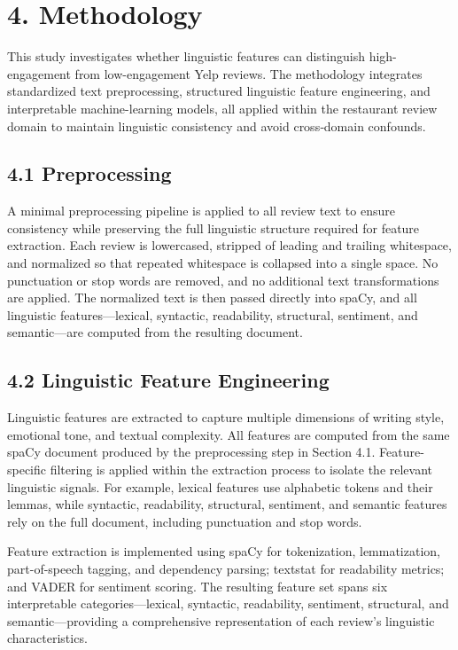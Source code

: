 \documentclass[
]{article}
\begin{document}
\hypertarget{methodology}{%
\section{4. Methodology}\label{methodology}}

This study investigates whether linguistic features can distinguish
high-engagement from low-engagement Yelp reviews. The methodology
integrates standardized text preprocessing, structured linguistic
feature engineering, and interpretable machine-learning models, all
applied within the restaurant review domain to maintain linguistic
consistency and avoid cross‑domain confounds.

\hypertarget{preprocessing}{%
\subsection{4.1 Preprocessing}\label{preprocessing}}

A minimal preprocessing pipeline is applied to all review text to ensure
consistency while preserving the full linguistic structure required for
feature extraction. Each review is lowercased, stripped of leading and
trailing whitespace, and normalized so that repeated whitespace is
collapsed into a single space. No punctuation or stop words are removed,
and no additional text transformations are applied. The normalized text
is then passed directly into spaCy, and all linguistic
features---lexical, syntactic, readability, structural, sentiment, and
semantic---are computed from the resulting document.

\hypertarget{linguistic-feature-engineering}{%
\subsection{4.2 Linguistic Feature
Engineering}\label{linguistic-feature-engineering}}

Linguistic features are extracted to capture multiple dimensions of
writing style, emotional tone, and textual complexity. All features are
computed from the same spaCy document produced by the preprocessing step
in Section 4.1. Feature-specific filtering is applied within the
extraction process to isolate the relevant linguistic signals. For
example, lexical features use alphabetic tokens and their lemmas, while
syntactic, readability, structural, sentiment, and semantic features
rely on the full document, including punctuation and stop words.

Feature extraction is implemented using spaCy for tokenization,
lemmatization, part-of-speech tagging, and dependency parsing; textstat
for readability metrics; and VADER for sentiment scoring. The resulting
feature set spans six interpretable categories---lexical, syntactic,
readability, sentiment, structural, and semantic---providing a
comprehensive representation of each review's linguistic
characteristics.
\end{document}
